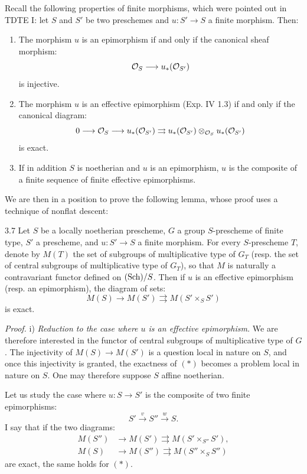 Recall the following properties of finite morphisms, which were pointed out in TDTE I: let $S$ and $S'$ be two preschemes and $u:S'\to S$ a finite morphism. Then:
\begin{enumerate}[label=\textup{\alph*)}]
\item The morphism $u$ is an epimorphism if and only if the canonical sheaf morphism:
\[
\mathcal{O}_S\longrightarrow u_*(\mathcal{O}_{S'})
\]
is injective.
\item The morphism $u$ is an effective epimorphism (Exp. IV 1.3) if and only if the canonical diagram:
\[
0\longrightarrow\mathcal{O}_S\longrightarrow u_*(\mathcal{O}_{S'})\rightrightarrows u_*(\mathcal{O}_{S'})\otimes_{\mathcal{O}_S}u_*(\mathcal{O}_{S'})
\]
is exact.
\item If in addition $S$ is noetherian and $u$ is an epimorphism, $u$ is the composite of a finite sequence of finite effective epimorphisms.
\end{enumerate}
We are then in a position to prove the following lemma, whose proof uses a technique of nonflat descent:
\begin{lemma}{3.7}\label{XV.3.7}
Let $S$ be a locally noetherian prescheme, $G$ a group $S$-prescheme of finite type, $S'$ a prescheme, and $u:S'\to S$ a finite morphism. For every $S$-prescheme $T$, denote by $M(T)$ the set of subgroups of multiplicative type of $G_T$ (resp. the set of central subgroups of multiplicative type of $G_T$), so that $M$ is naturally a contravariant functor defined on $\textup{(Sch)}/S$. Then if $u$ is an effective epimorphism (resp. an epimorphism), the diagram of sets:
\begin{equation}\tag{$\ast$}
M(S)\to M(S')\rightrightarrows M(S'\times_S S')
\end{equation}
is exact.
\end{lemma}
\par\noindent\emph{Proof.} i) \emph{Reduction to the case where $u$ is an effective epimorphism.} We are therefore interested in the functor of central subgroups of multiplicative type of $G$. The injectivity of $M(S)\to M(S')$ is a question local in nature on $S$, and once this injectivity is granted, the exactness of $(\ast)$ becomes a problem local in nature on $S$. One may therefore suppose $S$ affine noetherian.

Let us study the case where $u:S\to S'$ is the composite of two finite epimorphisms:
\[
S'\xrightarrow{v}S''\xrightarrow{w}S.
\]
I say that if the two diagrams:
\begin{align}\tag{$\ast'$}
M(S'')&\to M(S')\rightrightarrows M(S'\times_{S''}S'),\\\tag{$\ast''$}
M(S)&\to M(S'')\rightrightarrows M(S''\times_S S'')
\end{align}
are exact, the same holds for $(\ast)$.

